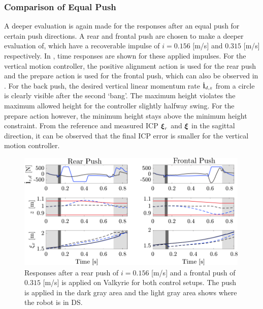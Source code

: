 \subsubsection{Comparison of Equal Push} 
A deeper evaluation is again made for the responses after an equal push for certain push directions. A rear and frontal push are chosen to make a deeper evaluation of, which have a recoverable impulse of $i=0.156$ [m/s] and $0.315$ [m/s] respectively. In , time responses are shown for these applied impulses. For the vertical motion controller, the positive alignment action is used for the rear push and the prepare action is used for the frontal push, which can also be observed in . For the back push, the desired vertical linear momentum rate $\dot{\mathbf{l}}_{d,z}$ from a circle is clearly visible after the second `bang'. The maximum height violates the maximum allowed height for the controller slightly halfway swing. For the prepare action however, the minimum height stays above the minimum height constraint. From the reference and measured \ac{ICP} $\boldsymbol{\xi}_r$ and $\boldsymbol{\xi}$ in the sagittal direction, it can be observed that the final \ac{ICP} error is smaller for the vertical motion controller.
\begin{figure}
     \centering
        \includegraphics[width=0.99\textwidth]{STYLESTUFF/walkplot.png}
    \caption{Responses after a rear push of $i=0.156$ [m/s] and a frontal push of $0.315$ [m/s] is applied on Valkyrie for both control setups. The push is applied in the dark gray area and the light gray area shows where the robot is in \ac{DS}.}
    \label{fig:walkplot}
\end{figure}

